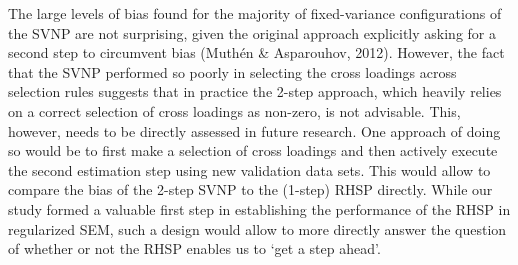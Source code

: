 \documentclass[
  man, donotrepeattitle,floatsintext]{apa6}
\begin{document}
The large levels of bias found for the majority of fixed-variance configurations of the SVNP are not surprising, given the original approach
explicitly asking for a second step to circumvent bias
(Muthén \& Asparouhov, 2012). However, the fact that the SVNP performed so
poorly in selecting the cross loadings across selection rules suggests
that in practice the 2-step approach, which heavily relies on a correct
selection of cross loadings as non-zero, is not advisable. This,
however, needs to be directly assessed in future research. One approach
of doing so would be to first make a selection of cross loadings and
then actively execute the second estimation step using new validation
data sets. This would allow to compare the bias of the 2-step SVNP to
the (1-step) RHSP directly. While our study formed a valuable first step
in establishing the performance of the RHSP in regularized SEM, such a
design would allow to more directly answer the question of whether or
not the RHSP enables us to `get a step ahead'.
\end{document}
